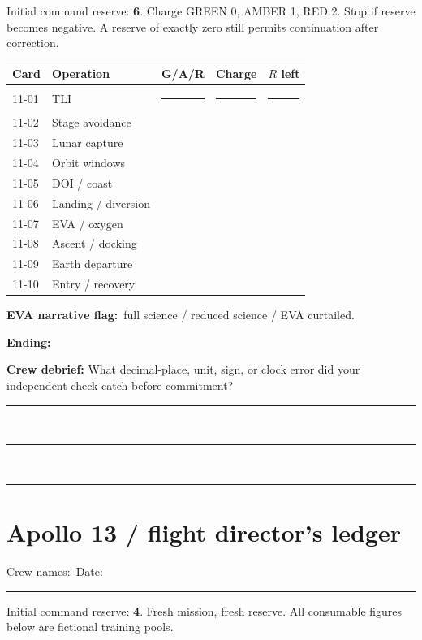 \documentclass[11pt]{article}
\begin{document}
Initial command reserve: \textbf{6}. Charge GREEN 0, AMBER 1, RED 2.
Stop if reserve becomes negative. A reserve of exactly zero still permits
continuation after correction.

\renewcommand{\arraystretch}{1.65}
\begin{tabularx}{\linewidth}{@{}lXccc@{}}
\toprule
Card & Operation & G/A/R & Charge & \(R\) left\\
\midrule
11-01 & TLI & \rule{0.4in}{0.3pt} & \rule{0.3in}{0.3pt} & \rule{0.3in}{0.3pt}\\
11-02 & Stage avoidance & & &\\
11-03 & Lunar capture & & &\\
11-04 & Orbit windows & & &\\
11-05 & DOI / coast & & &\\
11-06 & Landing / diversion & & &\\
11-07 & EVA / oxygen & & &\\
11-08 & Ascent / docking & & &\\
11-09 & Earth departure & & &\\
11-10 & Entry / recovery & & &\\
\bottomrule
\end{tabularx}
\renewcommand{\arraystretch}{1}

\textbf{EVA narrative flag:}\ full science / reduced science / EVA curtailed.

\textbf{Ending:}\ \hrulefill

\vspace{0.3in}
\textbf{Crew debrief:} What decimal-place, unit, sign, or clock error
did your independent check catch before commitment?
\vfill
\rule{\linewidth}{0.3pt}\\[30pt]\rule{\linewidth}{0.3pt}\\[30pt]
\rule{\linewidth}{0.3pt}

\clearpage
\section*{Apollo 13 / flight director's ledger}
Crew names:\ \hrulefill\qquad Date:\ \rule{1in}{0.3pt}

Initial command reserve: \textbf{4}. Fresh mission, fresh reserve.
All consumable figures below are fictional training pools.
\end{document}
